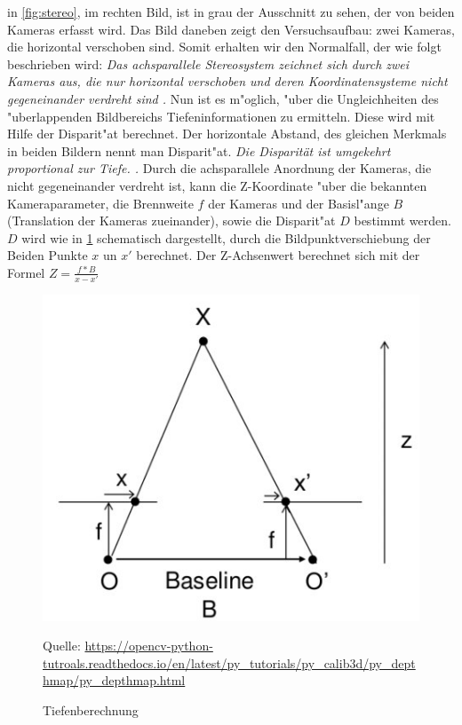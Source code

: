 \noindent in \ref{fig:stereo}, im rechten Bild, ist in grau der Ausschnitt zu sehen, der von beiden Kameras erfasst wird. Das Bild daneben zeigt den Versuchsaufbau: zwei Kameras, die horizontal verschoben sind. Somit erhalten wir den Normalfall, der wie folgt beschrieben wird: \textit{Das achsparallele Stereosystem zeichnet sich durch zwei Kameras aus, die nur horizontal verschoben und deren Koordinatensysteme nicht gegeneinander verdreht sind \cite{Tu}.}\newline
\noindent Nun ist es m"oglich, "uber die Ungleichheiten des "uberlappenden Bildbereichs Tiefeninformationen zu ermitteln. Diese wird mit Hilfe der Disparit"at berechnet.\newline
Der horizontale Abstand, des gleichen Merkmals in beiden Bildern nennt man Disparit"at. \textit{Die Disparität ist umgekehrt proportional zur Tiefe. \cite{Tu}.}\newline
Durch die achsparallele Anordnung der Kameras, die nicht gegeneinander verdreht ist, kann die Z-Koordinate "uber die bekannten Kameraparameter, die Brennweite $f$ der Kameras und der Basisl"ange $B$ (Translation der Kameras zueinander), sowie die Disparit"at $D$ bestimmt werden. $D$ wird wie in \ref{fig:base} schematisch dargestellt, durch die Bildpunktverschiebung der Beiden Punkte $x$ un $x'$ berechnet. Der Z-Achsenwert berechnet sich mit der Formel $Z=\frac{f*B}{x-x'}$
 
 \begin{figure}[H]
 	\includegraphics[scale=1.0]{bilder/tiefenberechnung}
 	\caption[Tiefenberechnung]{Tiefenberechnung}
 	\small Quelle: \url{https://opencv-python-tutroals.readthedocs.io/en/latest/py_tutorials/py_calib3d/py_depthmap/py_depthmap.html}
 	\label{fig:base}%
 \end{figure}
 
